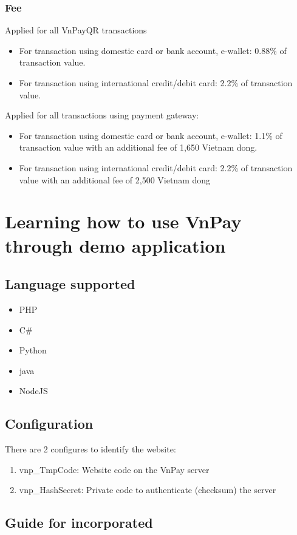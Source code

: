 \documentclass[12pt,a4paper]{article}
\begin{document}
	\subsubsection{Fee}
	Applied for all VnPayQR transactions
	\begin{itemize}
		\item For transaction using domestic card or bank account, e-wallet: 0.88\% of transaction value.
		\item For transaction using international credit/debit card: 2.2\% of transaction value.
	\end{itemize}
	Applied for all transactions using payment gateway:
	\begin{itemize}
		\item For transaction using domestic card or bank account, e-wallet: 1.1\% of transaction value with an additional fee of 1,650 Vietnam dong.
		\item For transaction using international credit/debit card: 2.2\% of transaction value with an additional fee of 2,500 Vietnam dong
	\end{itemize}
\section{Learning how to use VnPay through demo application}
\subsection{Language supported}
\begin{itemize}
	\item PHP
	\item C\#
	\item Python
	\item java
	\item NodeJS
\end{itemize}
\subsection{Configuration}
There are 2 configures to identify the website:
\begin{enumerate}
	\item vnp\_TmpCode: Website code on the VnPay server
	\item vnp\_HashSecret: Private code to authenticate (checksum) the server
\end{enumerate}
\subsection{Guide for incorporated}
\end{document}
